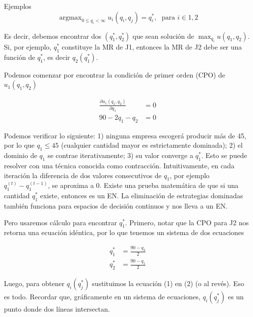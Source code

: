 \documentclass[12pt]{scrartcl}
\theoremstyle{definition}
\DeclareMathOperator*{\argmax}{argmax}
\begin{document}
\begin{exbox}{Ejemplos}
\[ \argmax_{0\leq q_i < \infty} u_i(q_i, q_j) = q_i^*,\; \text{ para } i\in{1,2}\]

Es decir, debemos encontrar dos $(q_1^*, q_2^*)$ que sean solución de $\max_{q_i} u(q_1, q_2)$. Si, por ejemplo, $q_1^*$ constituye la MR de J1, entonces la MR de J2 debe ser una función de $q_1^*$, es decir $q_2(q_1^*)$.

Podemos comenzar por encontrar la condición de primer orden (CPO) de $u_1(q_1, q_2)$

\begin{align*}
    \frac{\partial u_1(q_1, q_2)}{\partial q_1} &= 0\\
    90 -2q_1 - q_2 &= 0
\end{align*}

Podemos verificar lo siguiente: 1) ninguna empresa escogerá producir más de 45, por lo que $q_1 \leq 45$ (cualquier cantidad mayor es estrictamente dominada); 2) el dominio de $q_1$ se contrae iterativamente; 3) su valor converge a $q_1^*$. Esto se puede resolver con una técnica conocida como contracción. Intuitivamente, en cada iteración la diferencia de dos valores consecutivos de $q_1$, por ejemplo $q_1^{(t)} - q_1^{(t-1)}$, se aproxima a 0. Existe una prueba matemática de que si una cantidad $q_1^*$ existe, entonces es un EN. La eliminación de estrategias dominadas también funciona para espacios de decisión continuos y nos lleva a un EN.

Pero usaremos cálculo para encontrar $q_1^*$. Primero, notar que la CPO para J2 nos retorna una ecuación idéntica, por lo que tenemos un sistema de dos ecuaciones

\begin{align}
    q_1^* &= \frac{90 - q_2}{2}\\
    q_2^* &= \frac{90 - q_1}{2}
\end{align}

Luego, para obtener $q_i(q_j^*)$ sustituimos la ecuación (1) en (2) (o al revés). Eso es todo. Recordar que, gráficamente en un sistema de ecuaciones, $q_i(q_j^*)$ es un punto donde dos líneas intersectan. 

\end{exbox}
\end{document}
